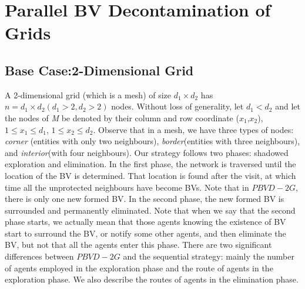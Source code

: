 \section{Parallel BV Decontamination of Grids}
\subsection{Base Case:2-Dimensional Grid}
A 2-dimensional grid (which is a mesh) of size $d_1\times d_2$ has $n=d_1\times d_2(d_1>2,d_2>2)$ nodes. Without loss of generality, let $d_1<d_2$ and let the nodes of {\em M} be denoted by their column and row coordinate ($x_1$,$x_2$), $1\leq x_1 \leq d_1$, $1\leq x_2 \leq d_2$. Observe that in a mesh, we have three types of nodes: \textit{corner} (entities with only two neighbours), \textit{border}(entities with three neighbours), and \textit{interior}(with four neighbours).  Our strategy follows two phases: shadowed exploration and elimination. In the first phase, the network is traversed until the location of the BV is determined. That location is found after the visit, at which time    all the  unprotected neighbours have become BVs.  Note that in $PBVD-2G$, there is  only one new formed BV. In the second phase, the new formed BV is surrounded and permanently eliminated. Note that when we say that  the second phase starts, we actually mean that those agents knowing the existence of BV start to surround the BV, or notify some other agents, and then eliminate the BV, but not   that all the agents enter this phase. There are two significant differences between $PBVD-2G$ and the sequential strategy: mainly the number of agents employed in the exploration phase and  the route of agents in the exploration phase. We also describe the routes of agents in the elimination phase. \ \\

 \\

